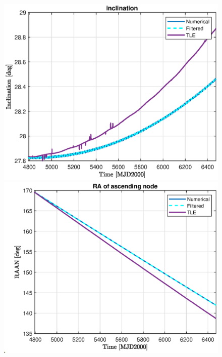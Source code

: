\begin{figure}[H]
\begin{minipage}{0.48\linewidth}
		\centering
		\includegraphics[width=\n\linewidth]{i_TLE.eps}
	\end{minipage}\hfill
	\begin{minipage}{0.48\linewidth}
		\centering
		\includegraphics[width=\n\linewidth]{RAAN_TLE.eps}
	\end{minipage}
	\vfill
	\begin{minipage}{0.48\linewidth}
		\centering

\end{minipage}
\end{figure}

